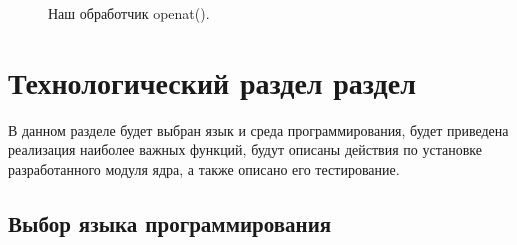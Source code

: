 \documentclass[a4paper,14pt]{article}
\begin{document}
\newpage
\begin{figure}[!h]
    \caption{Наш обработчик openat().}
    \label{fig:openat}
\end{figure}

\newpage
\section{Технологический раздел раздел}

В данном разделе будет выбран язык и среда программирования, будет приведена реализация наиболее важных функций, будут описаны действия по установке разработанного модуля ядра, а также описано его тестирование.

\subsection{Выбор языка программирования}
\end{document}
